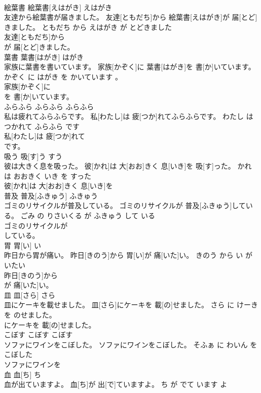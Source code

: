 \documentclass[8pt]{extreport}
\begin{document}
\begin{CJK}{UTF8}{min}
\\	絵葉書	絵葉書[えはがき]	えはがき	
\\	友達から絵葉書が届きました。	友達[ともだち]から 絵葉書[えはがき]が 届[とど]きました。	ともだち から えはがき が とどきました	
\\	友達[ともだち]から
\\	が 届[とど]きました。			
\\	葉書	葉書[はがき]	はがき	
\\	家族に葉書を書いています。	家族[かぞく]に 葉書[はがき]を 書[か]いています。	かぞく に はがき を かいています 。	
\\	家族[かぞく]に
\\	を 書[か]いています。			
\\	ふらふら	ふらふら	ふらふら	
\\	私は疲れてふらふらです。	私[わたし]は 疲[つか]れてふらふらです。	わたし は つかれて ふらふら です	
\\	私[わたし]は 疲[つか]れて
\\	です。			
\\	吸う	吸[す]う	すう	
\\	彼は大きく息を吸った。	彼[かれ]は 大[おお]きく 息[いき]を 吸[す]った。	かれ は おおきく いき を すった	
\\	彼[かれ]は 大[おお]きく 息[いき]を
\\	普及	普及[ふきゅう]	ふきゅう	
\\	ゴミのリサイクルが普及している。	ゴミのリサイクルが 普及[ふきゅう]している。	ごみ の りさいくる が ふきゅう して いる	
\\	ゴミのリサイクルが
\\	している。			
\\	胃	胃[い]	い	
\\	昨日から胃が痛い。	昨日[きのう]から 胃[い]が 痛[いた]い。	きのう から い が いたい	
\\	昨日[きのう]から
\\	が 痛[いた]い。			
\\	皿	皿[さら]	さら	
\\	皿にケーキを載せました。	皿[さら]にケーキを 載[の]せました。	さら に けーき を のせました。	
\\	にケーキを 載[の]せました。			
\\	こぼす	こぼす	こぼす	
\\	ソファにワインをこぼした。	ソファにワインをこぼした。	そふぁ に わいん を こぼした	
\\	ソファにワインを
\\	血	血[ち]	ち	
\\	血が出ていますよ。	血[ち]が 出[で]ていますよ。	ち が でて います よ	

\end{CJK}
\end{document}
